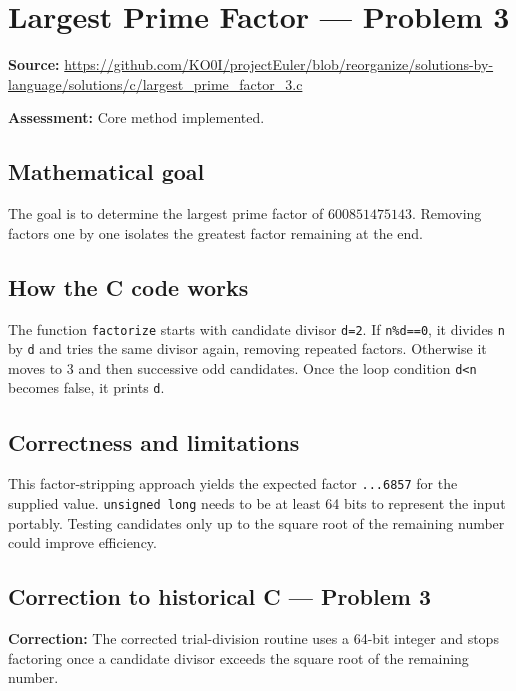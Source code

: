 \section{Largest Prime Factor --- Problem 3}
\label{prob:3}
\noindent\textbf{Source:} \url{https://github.com/KO0I/projectEuler/blob/reorganize/solutions-by-language/solutions/c/largest_prime_factor_3.c}

\noindent\textbf{Assessment:} Core method implemented.

\subsection*{Mathematical goal}
The goal is to determine the largest prime factor of \(600851475143\). Removing factors one by one isolates the greatest factor remaining at the end.

\subsection*{How the C code works}
The function \verb|factorize| starts with candidate divisor \verb|d=2|. If \verb|n%d==0|, it divides \verb|n| by \verb|d| and tries the same divisor again, removing repeated factors. Otherwise it moves to 3 and then successive odd candidates. Once the loop condition \verb|d<n| becomes false, it prints \verb|d|.

\subsection*{Correctness and limitations}
This factor-stripping approach yields the expected factor \texttt{...6857} for the supplied value. \verb|unsigned long| needs to be at least 64 bits to represent the input portably. Testing candidates only up to the square root of the remaining number could improve efficiency.


\subsection*{Correction to historical C --- Problem 3}
{\color{red}\textbf{Correction:} The corrected trial-division routine uses a 64-bit integer and stops factoring once a candidate divisor exceeds the square root of the remaining number.}
